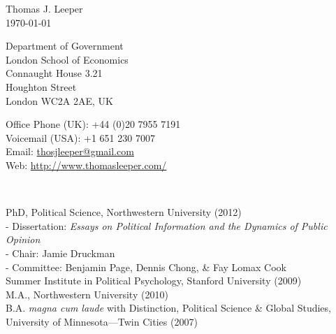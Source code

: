 \documentclass[12pt]{article}
\renewcommand{\section}[1]{\pagebreak[3]%
    \llap{\scshape\smash{\parbox[t]{\marginparwidth}{\raggedright {\color{lg}#1}}}}%
    \vspace{-\baselineskip}\par}
\newcommand{\entry}[1]{\indent {\color{lg}\guillemotright}\hspace{2pt}#1\vspace{.25em}\\}
\newcommand{\subentry}[1]{{\color{lg}-} #1\vspace{.25em}\\}
\begin{document}
{\LARGE Thomas J. Leeper}\\

\today\\

\begin{minipage}[b]{0.5\linewidth}
Department of Government\\
London School of Economics\\
Connaught House 3.21\\
Houghton Street\\
London WC2A 2AE, UK
\end{minipage}
\begin{minipage}[b]{0.5\linewidth}
Office Phone (UK): +44 (0)20 7955 7191\\
Voicemail (USA): +1 651 230 7007\\
Email: \href{mailto:thosjleeper@gmail.com}{thosjleeper@gmail.com}\\
Web: \href{http://www.thomasleeper.com/}{http://www.thomasleeper.com/}\\
\end{minipage}\\

\section{Education}
\entry{PhD, Political Science, Northwestern University (2012)}
\subentry{Dissertation: {\em Essays on Political Information and the Dynamics of Public Opinion}}
\subentry{Chair: Jamie Druckman}
\subentry{Committee: Benjamin Page, Dennis Chong, \& Fay Lomax Cook}
\entry{Summer Institute in Political Psychology, Stanford University (2009)}
\entry{M.A., Northwestern University (2010)}
\entry{B.A. {\em magna cum laude} with Distinction, Political Science \& Global Studies, University of Minnesota---Twin Cities (2007)}
\end{document}

